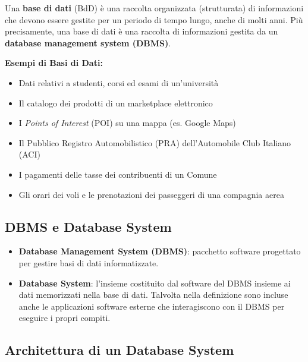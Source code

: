 \documentclass[12pt, a4paper]{article}
\begin{document}
Una \textcolor{tocsec}{\textbf{base di dati}} (BdD) è una raccolta organizzata (strutturata) di informazioni che devono essere gestite per un periodo di tempo lungo, anche di molti anni. Più precisamente, una base di dati è una raccolta di informazioni gestita da un \textcolor{tocsec}{\textbf{database management system (DBMS)}}.

\textbf{Esempi di Basi di Dati:}
\begin{itemize}
    \item Dati relativi a studenti, corsi ed esami di un'università
    \item Il catalogo dei prodotti di un marketplace elettronico
    \item I \textit{Points of Interest} (POI) su una mappa (es. Google Maps)
    \item Il Pubblico Registro Automobilistico (PRA) dell'Automobile Club Italiano (ACI)
    \item I pagamenti delle tasse dei contribuenti di un Comune
    \item Gli orari dei voli e le prenotazioni dei passeggeri di una compagnia aerea
\end{itemize}

\subsection{DBMS e Database System}

\begin{itemize}
    \item \textbf{Database Management System (DBMS)}: pacchetto software progettato per gestire basi di dati informatizzate.
    \item \textbf{Database System}: l'insieme costituito dal software del DBMS insieme ai dati memorizzati nella base di dati. Talvolta nella definizione sono incluse anche le applicazioni software esterne che interagiscono con il DBMS per eseguire i propri compiti.
\end{itemize}

\subsection{Architettura di un Database System}
\end{document}
